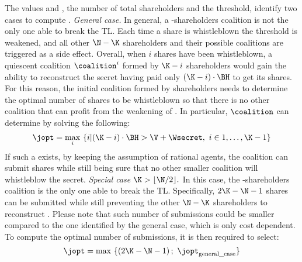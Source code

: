 The values \N and \K, the number of total shareholders and the threshold, identify two cases to compute  \jopt. \newline \vspace*{-0.5em} \newline
{\em General case.}
In general, a \K-shareholders coalition \coalition is not the only one able to break the TL. 
Each time a share is whistleblown the threshold \K is weakened, and all other $\N-\K$ shareholders and their possible coalitions are triggered as a side effect.
%
Overall, when $i$ shares have been whistleblown, a quiescent coalition $\coalition^i$ formed by $\K-i$ shareholders would gain the ability to reconstruct the secret \secret having paid only $(\K-i) \cdot \BH$ to get its shares. 
For this reason, the initial coalition \coalition formed by \K shareholders needs to determine the optimal number of shares \jopt to be whistleblown so that there is no other coalition that can profit from the weakening of \K. In particular, $\coalition$ can determine \jopt by solving the following:	
$$\jopt = \operatorname*{max}_i\ \{i | (\K-i) \cdot \BH > \V + \Wsecret,\ i \in 1,\ldots,\K-1 \}$$
If such a \jopt exists, by keeping the assumption of rational agents, the coalition \coalition can submit \jopt shares while still being sure that no other smaller coalition will whistleblow the secret.	\newline \vspace*{-0.5em} \newline
{\em Special case $\K > \lfloor \N/2 \rfloor. $}
In this case, the \K-shareholders coalition \coalition is the only one able to break the TL. 
Specifically, $2\K-\N-1$ shares can be submitted while still preventing the other $\N-\K$ shareholders to reconstruct \secret. 
Please note that such number of submissions could be smaller compared to the one identified by the general case, which is only cost dependent. 
To compute the optimal number of submissions, it is then required to select:
$$ \jopt = \operatorname*{max}\ \{ \left( 2\K - \N - 1 \right) ; \text{ } \jopt _\text{general\textunderscore case} \}$$

